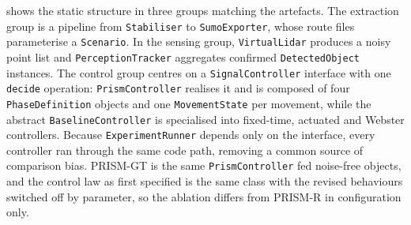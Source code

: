 \begin{sloppypar}
 shows the static structure in three groups matching the artefacts. The extraction group is a pipeline from \texttt{Stabiliser} to \texttt{SumoExporter}, whose route files parameterise a \texttt{Scenario}. In the sensing group, \texttt{VirtualLidar} produces a noisy point list and \texttt{PerceptionTracker} aggregates confirmed \texttt{DetectedObject} instances. The control group centres on a \texttt{SignalController} interface with one \texttt{decide} operation: \texttt{PrismController} realises it and is composed of four \texttt{PhaseDefinition} objects and one \texttt{MovementState} per movement, while the abstract \texttt{BaselineController} is specialised into fixed-time, actuated and Webster controllers. Because \texttt{ExperimentRunner} depends only on the interface, every controller ran through the same code path, removing a common source of comparison bias. PRISM-GT is the same \texttt{PrismController} fed noise-free objects, and the control law as first specified is the same class with the revised behaviours switched off by parameter, so the ablation differs from PRISM-R in configuration only.
\end{sloppypar}

